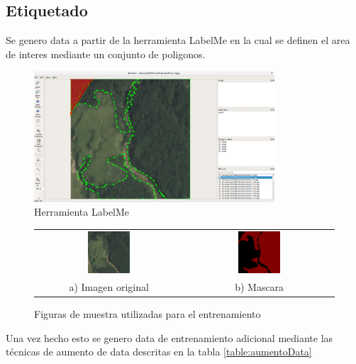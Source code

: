 \subsection{Etiquetado}
Se genero data a partir de la herramienta LabelMe en la cual se definen el area de interes mediante un conjunto de poligonos.
    \begin{figure}[H]
        \centering
        \includegraphics[width=0.8\textwidth]{images/labelme.png}
        \caption{Herramienta LabelMe}
        \label{fig:my_label}
    \end{figure}  
\begin{figure}[H]
	\centering
	\begin{tabular}{cc}
		\includegraphics[width=0.3\textwidth]{06changedetection/train_1.jpg} &
		\includegraphics[width=0.3\textwidth]{06changedetection/label2.png} \\
		a) Imagen original & b) Mascara 				
	\end{tabular}
	\caption{Figuras de muestra utilizadas para el entrenamiento}
	\label{fig:ProblemasVisionComputacional}
\end{figure}
Una vez hecho esto se genero data de entrenamiento adicional mediante las técnicas de aumento de data descritas en la tabla \ref{table:aumentoData} 

